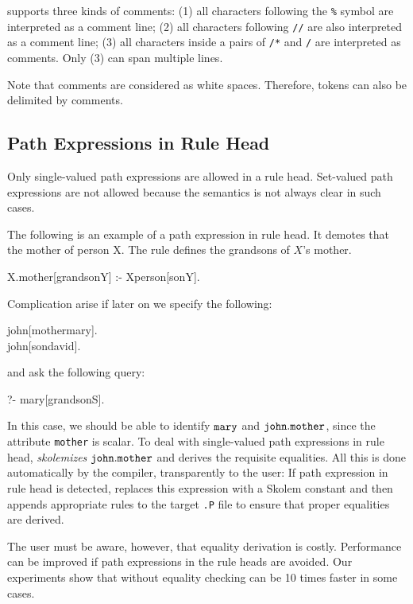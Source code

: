 \documentclass[11pt]{report}
\begin{document}
\FLORA supports three kinds of comments: (1) all characters following the
{\tt \%} symbol are interpreted as a comment line; (2) all characters
following {\tt //} are also interpreted as a comment line;
(3) all characters inside a pairs of {\tt /*} and {\tt */} are
interpreted as comments. Only (3) can span multiple lines.

Note that comments are considered as white spaces. Therefore, tokens can
also be delimited by comments.

\subsection{Path Expressions in Rule Head}

Only single-valued path expressions are allowed in a rule head. Set-valued
path expressions are not allowed because the semantics is not always clear
in such cases.

The following is an example of a path expression in rule head. It demotes
that the mother of person X. The rule defines the grandsons of $X$'s
mother.
\begin{qrules}
X.mother[grandson{\mvd}Y] :- X{\isa}person[son{\mvd}Y].
\end{qrules}
Complication arise if later on we specify the following:
\begin{qrules}
john[mother{\fd}mary]. \\
john[son{\mvd}david].
\end{qrules}
and ask the following query:
\begin{qrules}
?- mary[grandson{\mvd}S].
\end{qrules}

In this case, we should be able to identify ${\tt mary}$ and ${\tt
  john.mother}$, since the attribute {\tt mother} is scalar. To deal with
single-valued path expressions in rule head, \FLORA \emph{skolemizes} ${\tt
  john.mother}$ and derives the requisite equalities.  All this is done
automatically by the \FLORA compiler, transparently to the user: If path
expression in rule head is detected, \FLORA replaces this expression with a
Skolem constant and then appends appropriate rules to the target {\tt .P}
file to ensure that proper equalities are derived.

The user must be aware, however, that equality derivation is costly.
Performance can be improved if path expressions in the rule heads are
avoided.  Our experiments show that without equality checking \FLORA can be
10 times faster in some cases.
\end{document}
